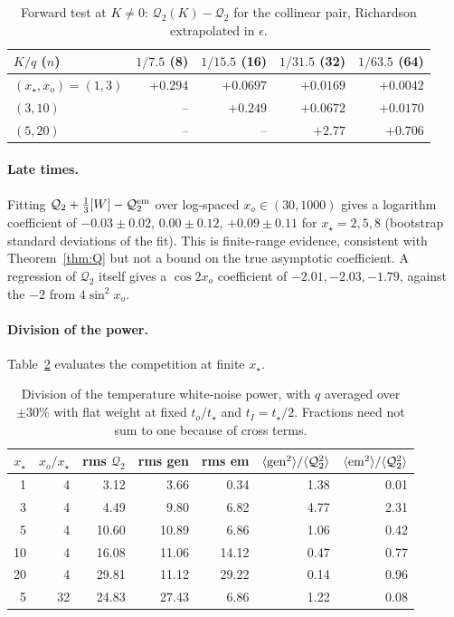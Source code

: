 \documentclass[10pt]{article}
\newcommand{\eps}{\epsilon}
\newcommand{\Q}{\mathcal Q_2}
\begin{document}
\begin{table}[h]
\centering
\begin{tabular}{lrrrr}
\toprule
$K/q$ ($n$) & $1/7.5$ (8) & $1/15.5$ (16) & $1/31.5$ (32) & $1/63.5$ (64)\\
\midrule
$(x_\star,x_o)=(1,3)$ & $+0.294$ & $+0.0697$ & $+0.0169$ & $+0.0042$\\
$(3,10)$ & -- & $+0.249$ & $+0.0672$ & $+0.0170$\\
$(5,20)$ & -- & -- & $+2.77$ & $+0.706$\\
\bottomrule
\end{tabular}
\caption{Forward test at $K\ne0$: $\Q(K)-\Q$ for the collinear pair, Richardson extrapolated in $\eps$.}\label{tab:K}
\end{table}

\paragraph{Late times.} Fitting $\Q+\frac13[W]-\Q^{\rm em}$ over log-spaced $x_o\in(30,1000)$ gives a logarithm coefficient of $-0.03\pm0.02$, $0.00\pm0.12$, $+0.09\pm0.11$ for $x_\star=2,5,8$ (bootstrap standard deviations of the fit). This is finite-range evidence, consistent with Theorem~\ref{thm:Q} but not a bound on the true asymptotic coefficient. A regression of $\Q$ itself gives a $\cos2x_o$ coefficient of $-2.01,-2.03,-1.79$, against the $-2$ from $4\sin^2x_o$.

\paragraph{Division of the power.} Table~\ref{tab:power} evaluates the competition at finite $x_\star$.

\begin{table}[h]
\centering
\begin{tabular}{rrrrrrr}
\toprule
$x_\star$ & $x_o/x_\star$ & rms $\Q$ & rms gen & rms em & $\langle{\rm gen}^2\rangle/\langle\Q^2\rangle$ & $\langle{\rm em}^2\rangle/\langle\Q^2\rangle$\\
\midrule
1 & 4 & 3.12 & 3.66 & 0.34 & 1.38 & 0.01\\
3 & 4 & 4.49 & 9.80 & 6.82 & 4.77 & 2.31\\
5 & 4 & 10.60 & 10.89 & 6.86 & 1.06 & 0.42\\
10 & 4 & 16.08 & 11.06 & 14.12 & 0.47 & 0.77\\
20 & 4 & 29.81 & 11.12 & 29.22 & 0.14 & 0.96\\
5 & 32 & 24.83 & 27.43 & 6.86 & 1.22 & 0.08\\
\bottomrule
\end{tabular}
\caption{Division of the temperature white-noise power, with $q$ averaged over $\pm30\%$ with flat weight at fixed $t_o/t_\star$ and $t_I=t_\star/2$. Fractions need not sum to one because of cross terms.}\label{tab:power}
\end{table}
\end{document}
